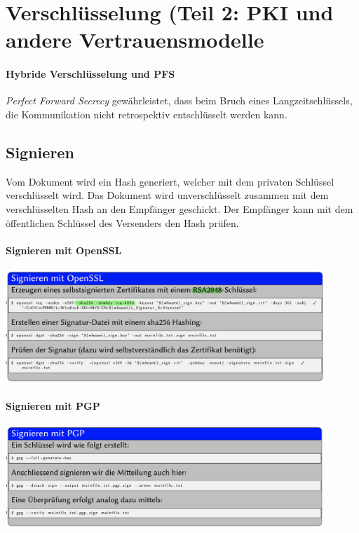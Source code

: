 \documentclass[a4paper,12pt]{article}
\begin{document}
\newpage
\section{Verschlüsselung (Teil 2: PKI und andere Vertrauensmodelle}

\paragraph{Hybride Verschlüsselung und PFS} \emph{Perfect Forward Secrecy} gewährleistet, dass beim Bruch eines Langzeitschlüssels, die Kommunikation nicht retrospektiv entschlüsselt werden kann.

\subsection{Signieren}
Vom Dokument wird ein Hash generiert, welcher mit dem privaten Schlüssel verschlüsselt wird. Das Dokument wird unverschlüsselt zusammen mit dem verschlüsselten Hash an den Empfänger geschickt. Der Empfänger kann mit dem öffentlichen Schlüssel des Versenders den Hash prüfen.

\paragraph{Signieren mit OpenSSL}

\begin{center}
\includegraphics[width=12cm]{img/04_openssl.png}
\end{center}

\paragraph{Signieren mit PGP}

\begin{center}
\includegraphics[width=12cm]{img/04_pgp.png}
\end{center}
\end{document}
